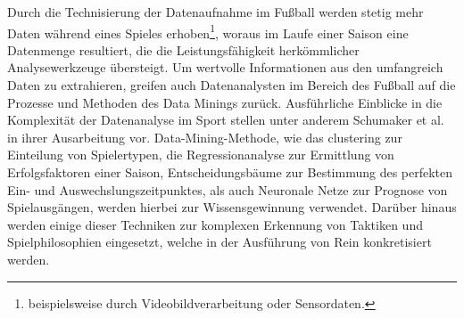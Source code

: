 Durch die Technisierung der Datenaufnahme im Fußball werden stetig mehr Daten während eines Spieles erhoben\footnote{beispielsweise durch Videobildverarbeitung oder Sensordaten.}, woraus im Laufe einer Saison eine Datenmenge resultiert, die die Leistungsfähigkeit herkömmlicher Analysewerkzeuge übersteigt. Um wertvolle Informationen aus den umfangreich Daten zu extrahieren, greifen auch Datenanalysten im Bereich des Fußball auf die Prozesse und Methoden des Data Minings zurück. Ausführliche Einblicke in die Komplexität der Datenanalyse im Sport stellen unter anderem Schumaker et al. in ihrer Ausarbeitung vor. Data-Mining-Methode, wie das \gls{clustering} zur Einteilung von Spielertypen, die Regressionanalyse zur Ermittlung von Erfolgsfaktoren einer Saison, Entscheidungsbäume zur Bestimmung des perfekten Ein- und Auswechslungszeitpunktes, als auch Neuronale Netze zur Prognose von Spielausgängen, werden hierbei zur Wissensgewinnung verwendet. Darüber hinaus werden einige dieser Techniken zur komplexen Erkennung von Taktiken und Spielphilosophien eingesetzt, welche in der Ausführung von Rein konkretisiert werden.



